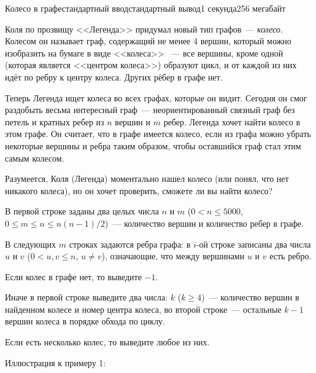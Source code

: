 \begin{problem}{Колесо в графе}{стандартный ввод}{стандартный вывод}{1 секунда}{256 мегабайт}

Коля по прозвищу <<Легенда>> придумал новый тип графов~--- \textit{колесо}. Колесом он называет граф, содержащий не менее 4 вершин, который можно изобразить на бумаге в виде <<колеса>>~ --- все вершины, кроме одной (которая является <<центром колеса>>) образуют цикл, и от каждой из них идёт по ребру к центру колеса. Других рёбер в графе нет.

Теперь Легенда ищет колеса во всех графах, которые он видит. Сегодня он смог раздобыть весьма интересный граф~--- неориентированный связный граф без петель и кратных ребер из $n$ вершин и $m$ ребер. Легенда хочет найти колесо в этом графе. Он считает, что в графе имеется колесо, если из графа можно убрать некоторые вершины и ребра таким образом, чтобы оставшийся граф стал этим самым колесом. 

Разумеется, Коля (Легенда) моментально нашел колесо (или понял, что нет никакого колеса), но он хочет проверить, сможете ли вы найти колесо? 

\InputFile
В первой строке заданы два целых числа $n$ и $m$ ($0 < n \leq 5000$, $0 \leq m \leq n \leq n (n-1) / 2$)~--- количество вершин и количество ребер в графе.

В следующих $m$ строках задаются ребра графа: в $i$-ой строке записаны два числа $u$ и $v$ ($0 < u, v \leq n$, $u \neq v$), означающие, что между вершинами $u$ и $v$ есть ребро.

\OutputFile
Если колес в графе нет, то выведите $-1$.

Иначе в первой строке выведите два числа: $k$ ($k \ge 4$)~--- количество вершин в найденном колесе и номер центра колеса, во второй строке~--- остальные $k-1$ вершин колеса в порядке обхода по циклу.

Если есть несколько колес, то выведите любое из них.

\Examples

\begin{example}
%
\end{example}
\begin{example}
%
\end{example}

\Note
Иллюстрация к примеру 1: 


\end{problem}
